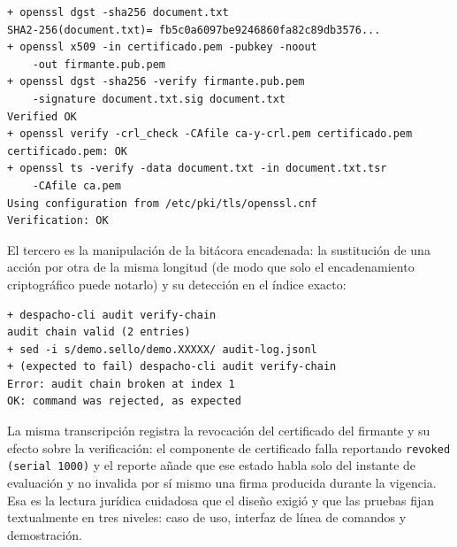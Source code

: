 \begin{lstlisting}[language={},numbers=none,caption={Verificación del paquete de evidencia con solo OpenSSL (extracto de \texttt{docs/demo-transcript.md}).},label={lst:pruebas-openssl}]
+ openssl dgst -sha256 document.txt
SHA2-256(document.txt)= fb5c0a6097be9246860fa82c89db3576...
+ openssl x509 -in certificado.pem -pubkey -noout
    -out firmante.pub.pem
+ openssl dgst -sha256 -verify firmante.pub.pem
    -signature document.txt.sig document.txt
Verified OK
+ openssl verify -crl_check -CAfile ca-y-crl.pem certificado.pem
certificado.pem: OK
+ openssl ts -verify -data document.txt -in document.txt.tsr
    -CAfile ca.pem
Using configuration from /etc/pki/tls/openssl.cnf
Verification: OK
\end{lstlisting}

El tercero es la manipulación de la bitácora encadenada: la sustitución de una acción por otra de la misma longitud (de modo que solo el encadenamiento criptográfico puede notarlo) y su detección en el índice exacto:

\begin{lstlisting}[language={},numbers=none,caption={Detección de la manipulación de la bitácora (extracto de \texttt{docs/demo-transcript.md}).},label={lst:pruebas-audit}]
+ despacho-cli audit verify-chain
audit chain valid (2 entries)
+ sed -i s/demo.sello/demo.XXXXX/ audit-log.jsonl
+ (expected to fail) despacho-cli audit verify-chain
Error: audit chain broken at index 1
OK: command was rejected, as expected
\end{lstlisting}

La misma transcripción registra la revocación del certificado del firmante y su efecto sobre la verificación: el componente de certificado falla reportando \texttt{revoked (serial 1000)} y el reporte añade que ese estado habla solo del instante de evaluación y no invalida por sí mismo una firma producida durante la vigencia. Esa es la lectura jurídica cuidadosa que el diseño exigió y que las pruebas fijan textualmente en tres niveles: caso de uso, interfaz de línea de comandos y demostración.
